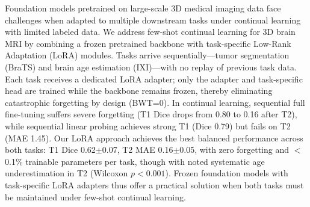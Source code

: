 Foundation models pretrained on large-scale 3D medical imaging data face challenges when adapted to multiple downstream tasks under continual learning with limited labeled data. We address few-shot continual learning for 3D brain MRI by combining a frozen pretrained backbone with task-specific Low-Rank Adaptation (LoRA) modules. Tasks arrive sequentially---tumor segmentation (BraTS) and brain age estimation (IXI)---with no replay of previous task data. Each task receives a dedicated LoRA adapter; only the adapter and task-specific head are trained while the backbone remains frozen, thereby eliminating catastrophic forgetting by design (BWT=0). In continual learning, sequential full fine-tuning suffers severe forgetting (T1 Dice drops from 0.80 to 0.16 after T2), while sequential linear probing achieves strong T1 (Dice 0.79) but fails on T2 (MAE 1.45). Our LoRA approach achieves the best balanced performance across both tasks: T1 Dice 0.62$\pm$0.07, T2 MAE 0.16$\pm$0.05, with zero forgetting and $<$0.1\% trainable parameters per task, though with noted systematic age underestimation in T2 (Wilcoxon $p<0.001$). Frozen foundation models with task-specific LoRA adapters thus offer a practical solution when both tasks must be maintained under few-shot continual learning.
